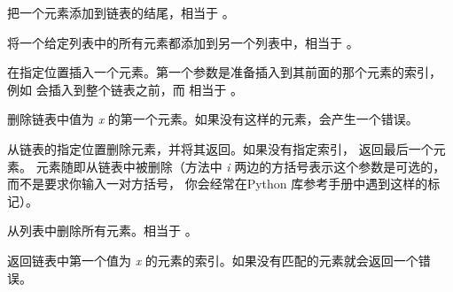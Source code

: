 \documentclass[a4paper,10pt,english]{sphinxmanual}
\begin{document}
\begin{fulllineitems}
把一个元素添加到链表的结尾，相当于 。

\end{fulllineitems}



\begin{fulllineitems}
将一个给定列表中的所有元素都添加到另一个列表中，相当于 。

\end{fulllineitems}



\begin{fulllineitems}
在指定位置插入一个元素。第一个参数是准备插入到其前面的那个元素的索引，
例如  会插入到整个链表之前，而  相当于 。

\end{fulllineitems}



\begin{fulllineitems}
删除链表中值为 \emph{x} 的第一个元素。如果没有这样的元素，会产生一个错误。

\end{fulllineitems}



\begin{fulllineitems}
从链表的指定位置删除元素，并将其返回。如果没有指定索引， 返回最后一个元素。
元素随即从链表中被删除（方法中 \emph{i} 两边的方括号表示这个参数是可选的，而不是要求你输入一对方括号，
你会经常在Python 库参考手册中遇到这样的标记）。

\end{fulllineitems}



\begin{fulllineitems}
从列表中删除所有元素。相当于 。

\end{fulllineitems}



\begin{fulllineitems}
返回链表中第一个值为 \emph{x} 的元素的索引。如果没有匹配的元素就会返回一个错误。

\end{fulllineitems}
\end{document}
